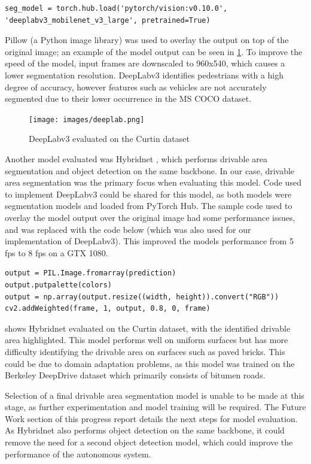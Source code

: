 \begin{verbatim}
seg_model = torch.hub.load('pytorch/vision:v0.10.0', 'deeplabv3_mobilenet_v3_large', pretrained=True)
\end{verbatim}

Pillow (a Python image library) was used to overlay the output on top of the original image;
an example of the model output can be seen in \cref{fig:deeplab}. To improve the speed of the model, input frames are
downscaled to 960x540, which causes a lower segmentation resolution.
DeepLabv3 identifies pedestrians with a high degree of accuracy, however
features such as vehicles are not accurately segmented due to their lower occurrence in the MS COCO dataset.

\begin{figure}[H]
    \centering
    \texttt{[image: images/deeplab.png]}
    \caption{DeepLabv3 evaluated on the Curtin dataset}
    \label{fig:deeplab}
\end{figure}

Another model evaluated was Hybridnet \cite{vuHybridNetsEndtoEndPerception2022}, which performs drivable area segmentation
and object detection on the same backbone. In our case, drivable area segmentation was the primary focus when evaluating this model.
Code used to implement DeepLabv3 could be shared for this model, as both models were segmentation models
and loaded from PyTorch Hub. The sample code used to overlay the model output over the original image had some
performance issues, and was replaced with the code below (which was also used for our implementation of DeepLabv3).
This improved the models performance from 5 fps to 8 fps on a GTX 1080.
\begin{verbatim}
output = PIL.Image.fromarray(prediction)
output.putpalette(colors)
output = np.array(output.resize((width, height)).convert("RGB"))
cv2.addWeighted(frame, 1, output, 0.8, 0, frame)
\end{verbatim}

 shows Hybridnet evaluated on the Curtin dataset, with the identified drivable area highlighted.
This model performs well on uniform surfaces but has more difficulty identifying the drivable area on surfaces such as paved bricks.
This could be due to domain adaptation problems, as this model was trained on the Berkeley DeepDrive dataset \cite{yuBDD100KDiverseDriving2018}
which primarily consists of bitumen roads.

Selection of a final drivable area segmentation model is unable to be made at this stage, as further experimentation and model training
will be required. The Future Work section of this progress report details the next steps for model evaluation.
As Hybridnet also performs object detection on the same backbone, it could remove the need for a second object detection model,
which could improve the performance of the autonomous system.

